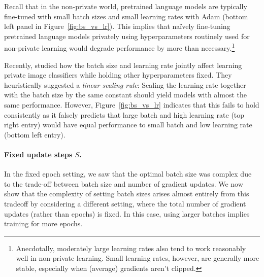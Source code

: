 Recall that in the non-private world, pretrained language models are typically fine-tuned with small batch sizes and small learning rates with Adam (bottom left panel in Figure~\ref{fig:bs_vs_lr}).
This implies that na\"ively fine-tuning pretrained language models privately using hyperparameters routinely used for non-private learning would degrade performance by more than necessary.\footnote{Anecdotally, moderately large learning rates also tend to work reasonably well in non-private learning. Small learning rates, however, are generally more stable, especially when (average) gradients aren't clipped.}

Recently, \cite{tramer2020differentially} studied how the batch size and learning rate jointly affect learning private image classifiers while holding other hyperparameters fixed.
They heuristically suggested a \textit{linear scaling rule}: Scaling the learning rate together with the batch size by the same constant should yield models with almost the same performance. 
However, Figure~\ref{fig:bs_vs_lr} indicates that this fails to hold consistently as it falsely predicts that large batch and high learning rate (top right entry) would have equal performance to small batch and low learning rate (bottom left entry).

\paragraph{Fixed update steps $S$.}
In the fixed epoch setting, we saw that the optimal batch size was complex due to the trade-off between batch size and number of gradient updates.
We now show that the complexity of setting batch sizes arises almost entirely from this tradeoff by considering a different setting, where the total number of gradient updates (rather than epochs) is fixed.
In this case, using larger batches implies training for more epochs.

